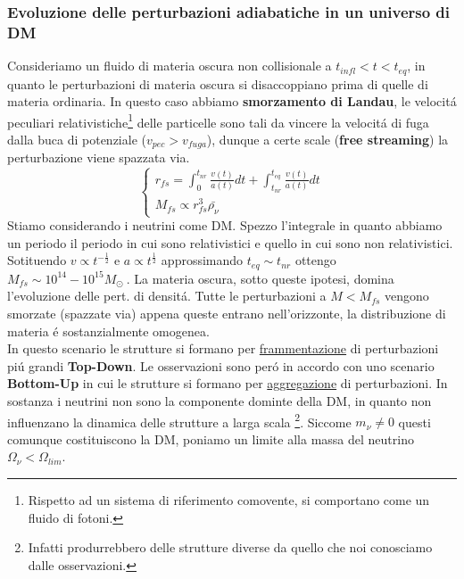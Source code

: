 \documentclass[12pt, a4paper]{article}
\begin{document}
\subsubsection{Evoluzione delle perturbazioni adiabatiche in un universo di DM}
Consideriamo un fluido di materia oscura non collisionale a $t_{infl}<t<t_{eq}$, in quanto le perturbazioni di materia oscura si disaccoppiano prima di quelle di materia ordinaria. In questo caso abbiamo \textbf{smorzamento di Landau}, le velocit\'{a} peculiari relativistiche\footnote{Rispetto ad un sistema di riferimento comovente, si comportano come un fluido di fotoni.} delle particelle sono tali da vincere la velocit\'{a} di fuga dalla buca di potenziale ($v_{pec}>v_{fuga}$), dunque a certe scale (\textbf{free streaming}) la perturbazione viene spazzata via.\\
\begin{equation}
\begin{cases}
r_{fs}= \int_0^{t_{nr}}\frac{v(t)}{a(t)} dt+\int_{t_{nr}}^{t_{eq}}\frac{v(t)}{a(t)} dt
\\
M_{fs}\propto r_{fs}^3 \bar{\rho_{\nu}}
\end{cases}
\end{equation}
Stiamo considerando i neutrini come DM. Spezzo l'integrale in quanto abbiamo un periodo il periodo in cui sono relativistici e quello in cui sono non relativistici. Sotituendo $v\propto t^{-\frac{1}{2}}$ e $a\propto t^{\frac{1}{2}} $ approssimando $t_{eq}\sim t_{nr}$ ottengo $M_{fs}\sim 10^{14} - 10^{15} M_\odot\ $. La materia oscura, sotto queste ipotesi, domina l'evoluzione delle pert. di densit\'{a}. Tutte le perturbazioni a $M<M_{fs}$ vengono smorzate (spazzate via) appena queste entrano nell'orizzonte, la distribuzione di materia \'{e} sostanzialmente omogenea.\\
In questo scenario le strutture si formano per \underline{frammentazione} di perturbazioni pi\'{u} grandi \textbf{Top-Down}. Le osservazioni sono per\'{o} in accordo con uno scenario \textbf{Bottom-Up} in cui le strutture si formano per \underline{aggregazione} di perturbazioni. In sostanza i neutrini non sono la componente dominte della DM, in quanto non influenzano la dinamica delle strutture a larga scala \footnote{Infatti produrrebbero delle strutture diverse da quello che noi conosciamo dalle osservazioni.}. Siccome $m_{\nu}\neq 0 $ questi comunque costituiscono la DM, poniamo un limite alla massa del neutrino $\Omega_{\nu}<\Omega_{lim}$.
\end{document}
